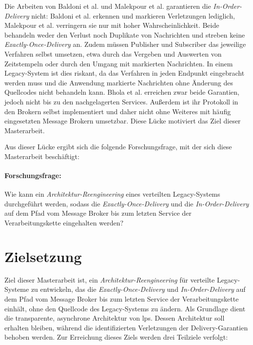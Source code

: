 Die Arbeiten von Baldoni et al. und Malekpour et al. garantieren die \textit{In-Order-Delivery} nicht: Baldoni et al. erkennen und markieren Verletzungen lediglich, Malekpour et al. verringern sie nur mit hoher Wahrscheinlichkeit. Beide behandeln weder den Verlust noch Duplikate von Nachrichten und streben keine \textit{Exactly-Once-Delivery} an. Zudem müssen Publisher und Subscriber das jeweilige Verfahren selbst umsetzen, etwa durch das Vergeben und Auswerten von Zeitstempeln oder durch den Umgang mit markierten Nachrichten. In einem Legacy-System ist dies riskant, da das Verfahren in jeden Endpunkt eingebracht werden muss und die Anwendung markierte Nachrichten ohne Änderung des Quellcodes nicht behandeln kann. Bhola et al. erreichen zwar beide Garantien, jedoch nicht bis zu den nachgelagerten Services. Außerdem ist ihr Protokoll in den Brokern selbst implementiert und daher nicht ohne Weiteres mit häufig eingesetzten Message Brokern umsetzbar. Diese Lücke motiviert das Ziel dieser Masterarbeit.

Aus dieser Lücke ergibt sich die folgende Forschungsfrage, mit der sich diese Masterarbeit beschäftigt:

\paragraph{Forschungsfrage:} Wie kann ein \textit{Architektur-Reengi\-neer\-ing} eines verteilten Legacy-Systems durchgeführt werden, sodass die \textit{Exactly-Once-Delivery} und die \textit{In-Order-Delivery} auf dem Pfad vom Message Broker bis zum letzten Service der Verarbeitungskette eingehalten werden?

\newpage

\section{Zielsetzung}
\label{sec:zielsetzung}

Ziel dieser Masterarbeit ist, ein \textit{Architektur-Reengineering} für verteilte Legacy-Systeme zu entwickeln, das die \textit{Exactly-Once-Delivery} und \textit{In-Order-Delivery} auf dem Pfad vom Message Broker bis zum letzten Service der Verarbeitungskette einhält, ohne den Quellcode des Legacy-Systems zu ändern. Als Grundlage dient die transparente, asynchrone Architektur von \gls{lps}. Dessen Architektur soll erhalten bleiben, während die identifizierten Verletzungen der Delivery-Garantien behoben werden. Zur Erreichung dieses Ziels werden drei Teilziele verfolgt:

